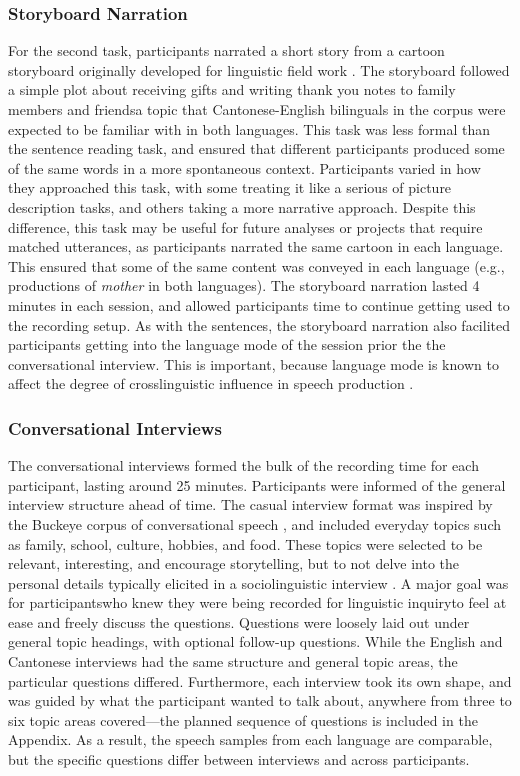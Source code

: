 \subsubsection{Storyboard Narration}\label{ch2:subsec:storyboard}
For the second task, participants narrated a short story from a cartoon storyboard originally developed for linguistic field work \citep{littell_2010_thank}. The storyboard followed a simple plot about receiving gifts and writing thank you notes to family members and friends\textemdash a topic that Cantonese-English bilinguals in the corpus were expected to be familiar with in both languages. This task was less formal than the sentence reading task, and ensured that different participants produced some of the same words in a more spontaneous context. Participants varied in how they approached this task, with some treating it like a serious of picture description tasks, and others taking a more narrative approach. Despite this difference, this task may be useful for future analyses or projects that require matched utterances, as participants narrated the same cartoon in each language. This ensured that some of the same content was conveyed in each language (e.g., productions of \textit{mother} in both languages). The storyboard narration lasted 4 minutes in each session, and allowed participants time to continue getting used to the recording setup. As with the sentences, the storyboard narration also facilited participants getting into the language mode of the session prior the the conversational interview. This is important, because language mode is known to affect the degree of crosslinguistic influence in speech production \citep{simonet_2019_convergence}.

\subsubsection{Conversational Interviews}\label{ch2:subsec:interview}
The conversational interviews formed the bulk of the recording time for each participant, lasting around 25 minutes. Participants were informed of the general interview structure ahead of time. The casual interview format was inspired by the Buckeye corpus of conversational speech \citep{pitt_2005_buckeye}, and included everyday topics such as family, school, culture, hobbies, and food. These topics were selected to be relevant, interesting, and encourage storytelling, but to not delve into the personal details typically elicited in a sociolinguistic interview \citep{nagy_2011_hlvc}. A major goal was for participants\textemdash who knew they were being recorded for linguistic inquiry\textemdash to feel at ease and freely discuss the questions. Questions were loosely laid out under general topic headings, with optional follow-up questions. While the English and Cantonese interviews had the same structure and general topic areas, the particular questions differed. Furthermore, each interview took its own shape, and was guided by what the participant wanted to talk about, anywhere from three to six topic areas covered---the planned sequence of questions is included in the Appendix. As a result, the speech samples from each language are comparable, but the specific questions differ between interviews and across participants. 

